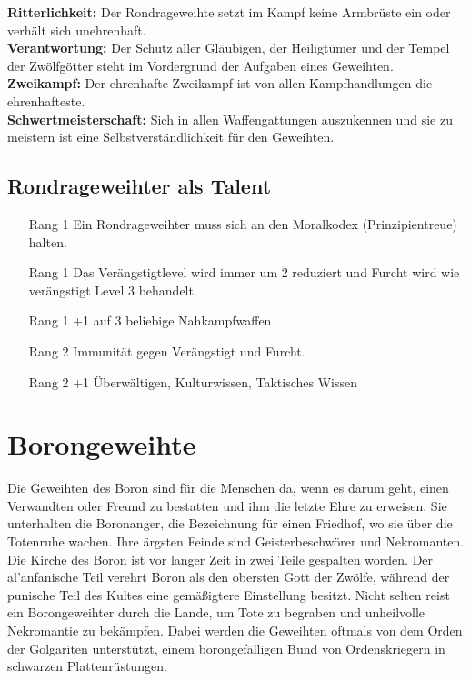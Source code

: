 \documentclass[../../Heldenanleitung2]{subfiles}
\begin{document}
\noindent
\textbf{Ritterlichkeit:} Der Rondrageweihte setzt im Kampf
keine Armbrüste ein oder verhält sich unehrenhaft.\\

\noindent
\textbf{Verantwortung:} Der Schutz aller Gläubigen, der
Heiligtümer und der Tempel der Zwölfgötter steht im
Vordergrund der Aufgaben eines Geweihten.\\

\noindent
\textbf{Zweikampf:} Der ehrenhafte Zweikampf ist von allen
Kampfhandlungen die ehrenhafteste.\\

\noindent
\textbf{Schwertmeisterschaft:} Sich in allen Waffengattungen
auszukennen und sie zu meistern ist eine Selbstverständlichkeit
für den Geweihten.

\subsection{Rondrageweihter als Talent}
\begin{itemize}
	\item[Rang 1] Ein Rondrageweihter muss sich an den Moralkodex
(Prinzipientreue) halten.
	\item[Rang 1] Das Verängstigtlevel wird immer um 2 reduziert und Furcht wird wie verängstigt Level 3 behandelt.
	\item[Rang 1] +1 auf 3 beliebige Nahkampfwaffen
	\item[Rang 2] Immunität gegen Verängstigt und Furcht.
	\item[Rang 2] +1 Überwältigen, Kulturwissen, Taktisches Wissen
\end{itemize}

\section{Borongeweihte}
Die Geweihten des Boron
sind für die Menschen
da, wenn es darum geht,
einen Verwandten oder
Freund zu bestatten und
ihm die letzte Ehre zu erweisen.
Sie unterhalten
die Boronanger, die Bezeichnung für
einen Friedhof, wo sie über
die Totenruhe wachen.
Ihre ärgsten Feinde sind Geisterbeschwörer
und Nekromanten. Die Kirche des Boron ist vor
langer Zeit in zwei Teile gespalten worden. Der al'anfanische
Teil verehrt Boron als den obersten Gott
der Zwölfe, während der punische Teil des Kultes eine gemäßigtere
Einstellung besitzt.
Nicht selten reist ein Borongeweihter durch die Lande,
um Tote zu begraben und unheilvolle Nekromantie
zu bekämpfen. Dabei werden die Geweihten oftmals
von dem Orden der Golgariten unterstützt, einem
borongefälligen Bund von Ordenskriegern in schwarzen
Plattenrüstungen.
\end{document}
